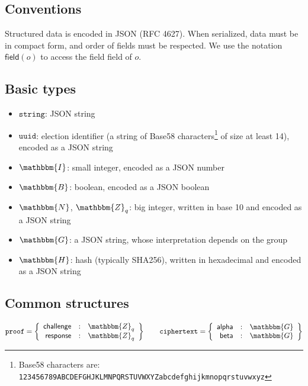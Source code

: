 \documentclass[a4paper]{article}
\newcommand{\G}{\mathbbm{G}}
\newcommand{\Z}{\mathbbm{Z}}
\newcommand{\N}{\mathbbm{N}}
\newcommand{\hash}{\mathbbm{H}}
\newcommand{\I}{\mathbbm{I}}
\newcommand{\B}{\mathbbm{B}}
\newcommand{\jstring}{\texttt{string}}
\newcommand{\uuid}{\texttt{uuid}}
\begin{document}
\subsection{Conventions}

Structured data is encoded in JSON (RFC 4627). When serialized, data
must be in compact form, and order of fields must be respected. We use
the notation $\textsf{field}(o)$ to access the field \textsf{field} of
$o$.

\subsection{Basic types}
\label{basic-types}

\begin{itemize}
\item $\jstring$: JSON string
\item $\uuid$: election identifier (a string of
  Base58 characters\footnote{Base58 characters are:
    \texttt{123456789ABCDEFGHJKLMNPQRSTUVWXYZabcdefghijkmnopqrstuvwxyz}}
  of size at least 14), encoded as a JSON string
\item $\I$: small integer, encoded as a JSON number
\item $\B$: boolean, encoded as a JSON boolean
\item $\N$, $\Z_q$: big integer, written in base 10 and encoded as a
  JSON string
\item $\G$: a JSON string, whose interpretation depends on the group
\item $\hash$: hash (typically SHA256), written in hexadecimal and
  encoded as a JSON string
\end{itemize}

\subsection{Common structures}
\label{common}

\begin{gather*}
  \proof=\left\{
    \begin{array}{rcl}
      \challenge&:&\Z_q\\
      \response&:&\Z_q
    \end{array}
  \right\}
  \qquad
  \ciphertext=\left\{
    \begin{array}{rcl}
      \alphalabel&:&\G\\
      \betalabel&:&\G
    \end{array}
  \right\}
\end{gather*}
\end{document}
